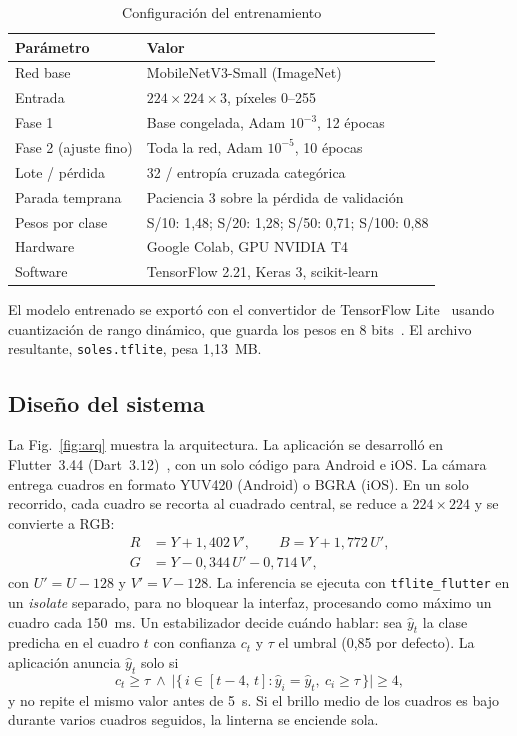 \documentclass[conference,a4paper]{IEEEtran}
\begin{document}
\begin{table}[!t]
\caption{Configuración del entrenamiento}
\label{tab:hiper}
\centering
\footnotesize
\begin{tabular}{|l|l|}
\hline
\textbf{Parámetro} & \textbf{Valor} \\
\hline
Red base & MobileNetV3-Small (ImageNet) \\
Entrada & $224\times224\times3$, píxeles 0--255 \\
Fase 1 & Base congelada, Adam $10^{-3}$, 12 épocas \\
Fase 2 (ajuste fino) & Toda la red, Adam $10^{-5}$, 10 épocas \\
Lote / pérdida & 32 / entropía cruzada categórica \\
Parada temprana & Paciencia 3 sobre la pérdida de validación \\
Pesos por clase & S/10: 1,48; S/20: 1,28; S/50: 0,71; S/100: 0,88 \\
Hardware & Google Colab, GPU NVIDIA T4 \\
Software & TensorFlow 2.21, Keras 3, scikit-learn~\cite{pedregosa2011} \\
\hline
\end{tabular}
\end{table}

El modelo entrenado se exportó con el convertidor de TensorFlow Lite~\cite{abadi2016,litert} usando cuantización de rango dinámico, que guarda los pesos en 8 bits~\cite{jacob2018}. El archivo resultante, \texttt{soles.tflite}, pesa 1,13~MB.

\subsection{Diseño del sistema}

La Fig.~\ref{fig:arq} muestra la arquitectura. La aplicación se desarrolló en Flutter~3.44 (Dart~3.12)~\cite{flutter}, con un solo código para Android e iOS. La cámara entrega cuadros en formato YUV420 (Android) o BGRA (iOS). En un solo recorrido, cada cuadro se recorta al cuadrado central, se reduce a $224\times224$ y se convierte a RGB:
\begin{equation}
\begin{aligned}
R &= Y + 1{,}402\,V', \qquad B = Y + 1{,}772\,U',\\
G &= Y - 0{,}344\,U' - 0{,}714\,V',
\end{aligned}
\end{equation}
con $U' = U-128$ y $V' = V-128$. La inferencia se ejecuta con \texttt{tflite\_flutter} en un \emph{isolate} separado, para no bloquear la interfaz, procesando como máximo un cuadro cada 150~ms. Un estabilizador decide cuándo hablar: sea $\hat{y}_t$ la clase predicha en el cuadro $t$ con confianza $c_t$ y $\tau$ el umbral (0,85 por defecto). La aplicación anuncia $\hat{y}_t$ solo si
\begin{equation}
c_t \geq \tau \ \wedge\ \bigl|\{\, i \in [t-4,\,t] : \hat{y}_i = \hat{y}_t,\ c_i \geq \tau \,\}\bigr| \geq 4,
\end{equation}
y no repite el mismo valor antes de 5~s. Si el brillo medio de los cuadros es bajo durante varios cuadros seguidos, la linterna se enciende sola.
\end{document}
